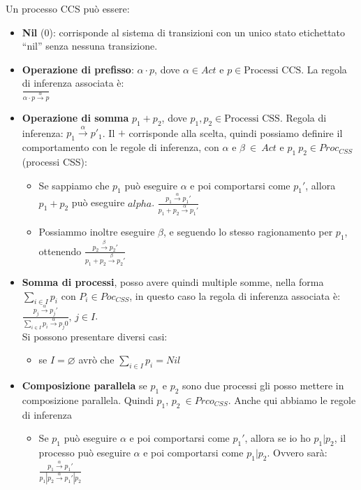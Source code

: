 Un processo CCS può essere:
\begin{itemize}
    \item \textbf{Nil} (0): corrisponde al sistema di transizioni con un unico stato etichettato “nil” senza nessuna transizione.
    \item \textbf{Operazione di prefisso}: $\alpha \cdot p$, dove $\alpha \in Act$ e $p \in \text{Processi CCS}$. La regola di inferenza associata è: \\ $\frac{}{\alpha \cdot p  \stackrel{\alpha}\to p}$
    \item \textbf{Operazione di somma} $p_1 + p_2$, dove $p_1, p_2 \in \text{Processi CSS}$.   Regola di inferenza: $p_1 \stackrel{\alpha}\to p'_1$. Il $+$ corrisponde alla scelta, quindi possiamo definire il comportamento con le regole di inferenza, con $\alpha$ e $\beta \ \in \ Act$ e $p_1 \ p_2 \in Proc_{CSS}$(processi CSS):
    \begin{itemize}
        \item Se sappiamo che $p_1$  può eseguire $\alpha$ e poi comportarsi come $p_1'$, allora $p_1 + p_2$ può eseguire $alpha$. $\frac{p_1 \stackrel{\alpha}\to p_1'}{p_1 + p_2 \stackrel{\alpha}\to p_1'}$
        \item Possiammo inoltre eseguire $\beta$, e seguendo lo stesso ragionamento per $p_1$, ottenendo
         $\frac{p_2 \stackrel{\beta}\to p_2'}{p_1 + p_2 \stackrel{\beta}\to p_2'}$
    \end{itemize}
    \item \textbf{Somma di processi}, posso avere quindi multiple somme, nella forma $\displaystyle \sum_{i\in I}p_i$ con $P_i \in Poc_{CSS}$, in questo caso la regola di inferenza associata è: $\frac{p_j\stackrel{\alpha}{\to}p_j'}{\displaystyle \sum_{i\in I}p_i\stackrel{\alpha}{\to}p_j0},\,j\in I$. \\
    Si possono presentare diversi casi: 
    \begin{itemize}
        \item se $I= \varnothing$ avrò che $\displaystyle \sum_{i\in I}p_i=Nil$
    \end{itemize}
    \item \textbf{Composizione parallela} se $p_1$ e $p_2$ sono due processi gli posso mettere in composizione parallela. Quindi $p_1$, $p_2 \ \in Prco_{CSS}$. Anche qui abbiamo le regole di inferenza
    \begin{itemize}
        \item Se $p_1$ può eseguire $\alpha$ e poi comportarsi come $p_1'$, allora se io ho $p_1 | p_2$, il processo può eseguire $\alpha$ e poi comportarsi come $p_1 | p_2$. Ovvero sarà: $\frac{p_1 \stackrel{\alpha}\to p_1'}{p_1|p_2 \stackrel{\alpha}\to p_1'|p_2}$

\end{itemize}
\end{itemize}
